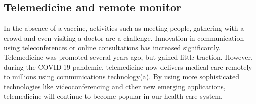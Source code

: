 \documentclass{article}
\begin{document}
 \subsection{Telemedicine and remote monitor}
 In the absence of a vaccine, activities such as meeting people, gathering with a crowd and even visiting a doctor are a challenge. Innovation in communication using teleconferences or online consultations has increased significantly. Telemedicine was promoted several years ago, but gained little traction. However, during the COVID-19 pandemic, telemedicine now delivers medical care remotely to millions using communications technology(a). By using more sophisticated technologies like videoconferencing and other new emerging applications, telemedicine will continue to become popular in our health care system.
 
 
 
 
 
\end{document}
